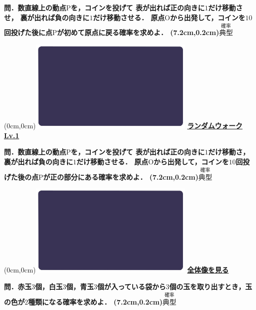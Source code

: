 \documentclass[10pt,
fleqn,
dvipdfmx,
uplatex
]{jsarticle}
\begin{document}
\normalsize 
\bf\boldmath 問．数直線上の動点$\text{P}$を，コインを投げて
表が出れば正の向きに$1$だけ移動させ，
裏が出れば負の向きに$1$だけ移動させる．
原点$\text{O}$から出発して，コインを${10}$回投げた後に点$\text{P}$が初めて原点に戻る確率を求めよ．
\at(7.2cm,0.2cm){\small\color{bradorange}$\overset{\text{確率}}{\text{典型}}$}


\newpage



\at(0cm,0cm){\includegraphics[width=8cm,bb=0 0 1920 1080]{./youtube/thumbnails/templates/smart_background/確率.jpeg}}
{\color{orange}\bf\boldmath\LARGE\underline{ランダムウォーク Lv.1 }}\vspace{0.3zw}

\normalsize 
\bf\boldmath 問．数直線上の動点$\text{P}$を，コインを投げて
表が出れば正の向きに$1$だけ移動さ，
裏が出れば負の向きに$1$だけ移動させる．
原点$\text{O}$から出発して，コインを${10}$回投げた後の点$\text{P}$が正の部分にある確率を求めよ．
\at(7.2cm,0.2cm){\small\color{bradorange}$\overset{\text{確率}}{\text{典型}}$}


\newpage



\at(0cm,0cm){\includegraphics[width=8cm,bb=0 0 1920 1080]{./youtube/thumbnails/templates/smart_background/確率.jpeg}}
{\color{orange}\bf\boldmath\huge\underline{全体像を見る}}\vspace{0.3zw}

\Large 
\bf\boldmath 問．赤玉$3$個，白玉$3$個，青玉$3$個が入っている袋から$3$個の玉を取り出すとき，玉の色が$2$種類になる確率を求めよ．
\at(7.2cm,0.2cm){\small\color{bradorange}$\overset{\text{確率}}{\text{典型}}$}
\end{document}
